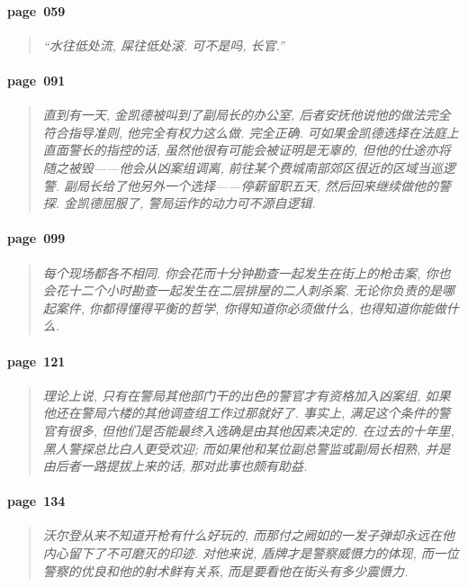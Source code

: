 \paragraph*{page~059}
\begin{quotation}
    \itshape
    ``水往低处流, 屎往低处滚. 可不是吗, 长官.'' 
\end{quotation}

\paragraph*{page~091}
\begin{quotation}
    \itshape
    直到有一天, 金凯德被叫到了副局长的办公室, 后者安抚他说他的做法完全符合指导准则, 他完全有权力这么做. 完全正确. 可如果金凯德选择在法庭上直面警长的指控的话, 虽然他很有可能会被证明是无辜的, 但他的仕途亦将随之被毁------他会从凶案组调离, 前往某个费城南部郊区很近的区域当巡逻警. 副局长给了他另外一个选择------停薪留职五天, 然后回来继续做他的警探. 金凯德屈服了, 警局运作的动力可不源自逻辑. 
\end{quotation}

\paragraph*{page~099}
\begin{quotation}
    \itshape
    每个现场都各不相同. 你会花而十分钟勘查一起发生在街上的枪击案, 你也会花十二个小时勘查一起发生在二层排屋的二人刺杀案. 无论你负责的是哪起案件, 你都得懂得平衡的哲学, 你得知道你必须做什么, 也得知道你能做什么. 
\end{quotation}

\paragraph*{page~121}
\begin{quotation}
    \itshape
    理论上说, 只有在警局其他部门干的出色的警官才有资格加入凶案组, 如果他还在警局六楼的其他调查组工作过那就好了. 事实上, 满足这个条件的警官有很多, 但他们是否能最终入选确是由其他因素决定的. 在过去的十年里, 黑人警探总比白人更受欢迎; 而如果他和某位副总警监或副局长相熟, 并是由后者一路提拔上来的话, 那对此事也颇有助益. 
\end{quotation}

\paragraph*{page~134}
\begin{quotation}
    \itshape
    沃尔登从来不知道开枪有什么好玩的, 而那付之阙如的一发子弹却永远在他内心留下了不可磨灭的印迹. 对他来说, 盾牌才是警察威慑力的体现, 而一位警察的优良和他的射术鲜有关系, 而是要看他在街头有多少震慑力. 
\end{quotation}

